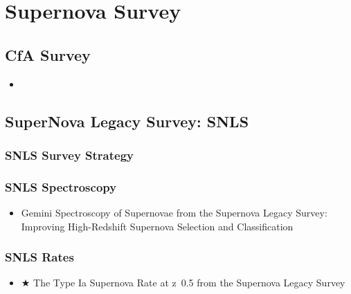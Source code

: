 \section{Supernova Survey}
\subsection{CfA Survey}
\begin{itemize}
\item 
\end{itemize}

\subsection{SuperNova Legacy Survey: SNLS}
\subsubsection{SNLS Survey Strategy}
\subsubsection{SNLS Spectroscopy}
\begin{itemize}
\item Gemini Spectroscopy of Supernovae from the Supernova Legacy Survey: Improving
 High-Redshift Supernova Selection and Classification 
\citep[][]{howell05a} \\
\end{itemize}

\subsubsection{SNLS Rates}
\begin{itemize}
\item $\bigstar$ The Type Ia Supernova Rate at z~0.5 from the Supernova Legacy Survey 
\citep[][\#76:4/30/10,neill06a]{neill06a}\\
\end{itemize}
